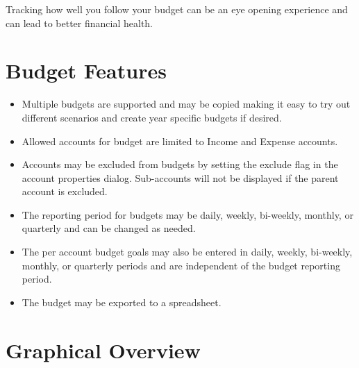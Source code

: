 \documentclass[letterpaper,12pt]{book}
\begin{document}
    Tracking how well you follow your budget can be an eye opening experience and can lead to better financial health.


    \section*{Budget Features}

    \begin{itemize}
        \item Multiple budgets are supported and may be copied making it easy to try out different scenarios and create year specific budgets if desired.
        \item Allowed accounts for budget are limited to Income and Expense accounts.
        \item Accounts may be excluded from budgets by setting the exclude flag in the account properties dialog. Sub-accounts will not be displayed if the parent account is excluded.
        \item The reporting period for budgets may be daily, weekly, bi-weekly, monthly, or quarterly and can be changed as needed.
        \item The per account budget goals may also be entered in daily, weekly, bi-weekly, monthly, or quarterly periods and are independent of the budget reporting period.
        \item The budget may be exported to a spreadsheet.
    \end{itemize}


    \section{Graphical Overview}
\end{document}

